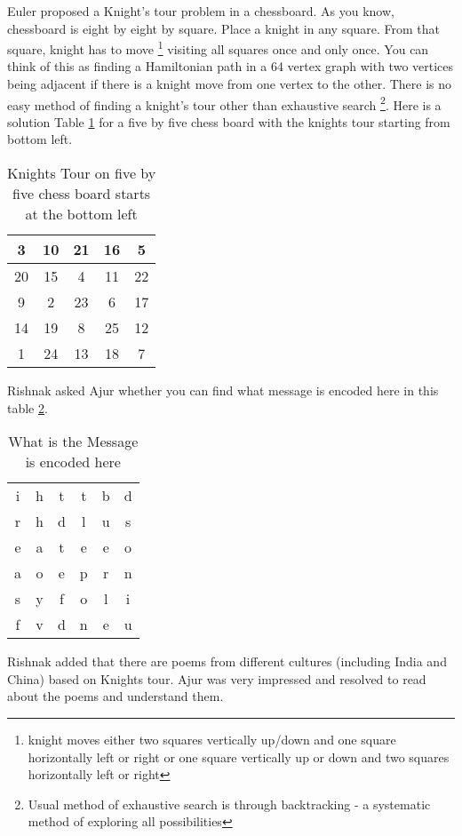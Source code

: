 Euler proposed a Knight's tour problem in a chessboard. As you know, chessboard is eight by eight by square. Place a knight in any square. From that square, knight has to move \footnote{knight moves either two squares vertically up/down and one square horizontally left or right or one square vertically up or down and two squares horizontally left or right} visiting all squares once and only once. You can think of this as finding a Hamiltonian path in a 64 vertex graph with two vertices being adjacent if there is a knight move from one vertex to the other. There is no easy method of finding a knight's tour other than exhaustive search \footnote{Usual method of exhaustive search is through backtracking - a systematic method of exploring all possibilities}. Here is a solution Table \ref{5t1} for a five by five chess board with the knights tour starting from bottom left.
\begin{table}
\centering
\begin{tabular}{|c |c |c| c| c|} 
 \hline
3&10&21&16& 5\\
\hline
20&15& 4&11&22\\
\hline
 9& 2&23& 6&17\\
 \hline
14&19& 8&25&12\\
\hline
 1&24&13&18& 7\\
 \hline
\end{tabular}
\caption{Knights Tour on five by five chess board starts at the bottom left}
\label{5t1}
\end{table}
Rishnak asked Ajur whether you can find what message is encoded here in this table \ref{5t2}.
\begin{table}
\centering
\begin{tabular}{c c c c cc}
i &h &t& t& b& d\\
r& h& d& l& u& s\\
e &a &t& e& e& o\\
a &o& e& p& r& n\\
s& y& f &o& l& i\\
f &v& d& n &e& u\\
\end{tabular}
\caption{What is the Message is encoded here}
\label{5t2}
\end{table}
Rishnak added that there are poems from different cultures (including India and China) based on Knights tour. Ajur was very impressed and resolved to read about the poems and understand them.